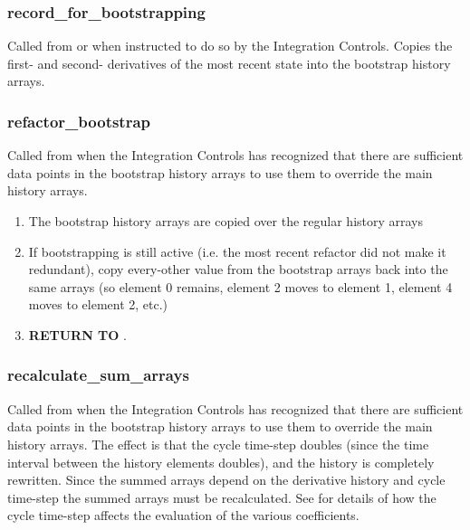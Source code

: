 \subsubsection{record\_for\_bootstrapping}\label{ref:GJ_record_for_bootstrapping}

Called from  or 
 when
instructed to do so by the Integration Controls.  Copies the
first- and second- derivatives of the most recent state into the
bootstrap history arrays.

\subsubsection{refactor\_bootstrap}\label{ref:GJ_refactor_bootstrap}

Called from  when the
Integration Controls has
recognized that there are sufficient data points in the bootstrap
history arrays to use them to override the main history arrays.

\begin{enumerate}
\item The bootstrap history arrays are copied over the regular history
arrays
\item If bootstrapping is still active (i.e. the most recent refactor
did not make it redundant), copy every-other value from the bootstrap
arrays back into the same arrays (so element 0 remains, element 2 moves
to element 1, element 4 moves to element 2, etc.)
\item {\bfseries RETURN TO} .
\end{enumerate}


\subsubsection{recalculate\_sum\_arrays}\label{ref:GJ_recalculate_sum_arrays}

Called from  when the Integration
Controls has
recognized that there are sufficient data points in the bootstrap
history arrays to use them to override the main history arrays. The
effect is that the cycle time-step doubles (since the time interval
between the history elements doubles), and the history is completely
rewritten. Since the summed arrays depend on the derivative history
and cycle time-step the summed arrays must be recalculated. See
for details of how the cycle time-step affects the evaluation of the
various coefficients.


